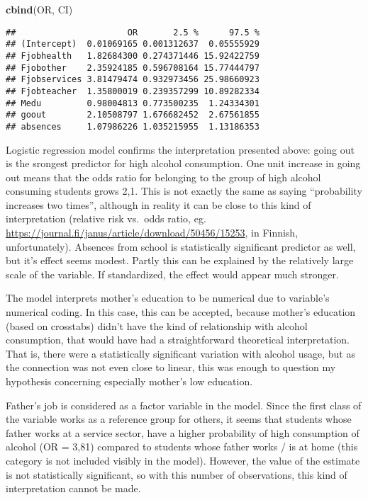 \documentclass[]{article}
\newenvironment{Shaded}{\begin{snugshade}}{\end{snugshade}}
\newcommand{\KeywordTok}[1]{\textcolor[rgb]{0.13,0.29,0.53}{\textbf{#1}}}
\newcommand{\NormalTok}[1]{#1}
\begin{document}
\begin{Shaded}
\begin{Highlighting}[]
\KeywordTok{cbind}\NormalTok{(OR, CI)}
\end{Highlighting}
\end{Shaded}

\begin{verbatim}
##                      OR       2.5 %      97.5 %
## (Intercept)  0.01069165 0.001312637  0.05555929
## Fjobhealth   1.82684300 0.274371446 15.92422759
## Fjobother    2.35924185 0.596708164 15.77444797
## Fjobservices 3.81479474 0.932973456 25.98660923
## Fjobteacher  1.35800019 0.239357299 10.89282334
## Medu         0.98004813 0.773500235  1.24334301
## goout        2.10508797 1.676682452  2.67561855
## absences     1.07986226 1.035215955  1.13186353
\end{verbatim}

Logistic regression model confirms the interpretation presented above:
going out is the srongest predictor for high alcohol consumption. One
unit increase in going out means that the odds ratio for belonging to
the group of high alcohol consuming students grows 2,1. This is not
exactly the same as saying ``probability increases two times'', although
in reality it can be close to this kind of interpretation (relative risk
vs.~odds ratio, eg.
\url{https://journal.fi/janus/article/download/50456/15253}, in Finnish,
unfortunately). Absences from school is statistically significant
predictor as well, but it's effect seems modest. Partly this can be
explained by the relatively large scale of the variable. If
standardized, the effect would appear much stronger.

The model interprets mother's education to be numerical due to
variable's numerical coding. In this case, this can be accepted, because
mother's education (based on crosstabs) didn't have the kind of
relationship with alcohol consumption, that would have had a
straightforward theoretical interpretation. That is, there were a
statistically significant variation with alcohol usage, but as the
connection was not even close to linear, this was enough to question my
hypothesis concerning especially mother's low education.

Father's job is considered as a factor variable in the model. Since the
first class of the variable works as a reference group for others, it
seems that students whose father works at a service sector, have a
higher probability of high consumption of alcohol (OR = 3,81) compared
to students whose father works / is at home (this category is not
included visibly in the model). However, the value of the estimate is
not statistically significant, so with this number of observations, this
kind of interpretation cannot be made.
\end{document}
